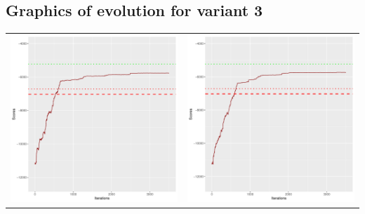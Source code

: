 \documentclass[]{scrartcl}
\begin{document}
\clearpage

\subsection{Graphics of evolution for variant 3}

\begin{table}[h!]
\begin{tabular}{cc}
\includegraphics[scale = 0.4]{./figs/alarm/v3/30/boundsEvolution-3502.pdf} & 
\includegraphics[scale = 0.4]{./figs/alarm/v3/50/boundsEvolution-3502.pdf} \\

\end{tabular}
\end{table}
\end{document}
